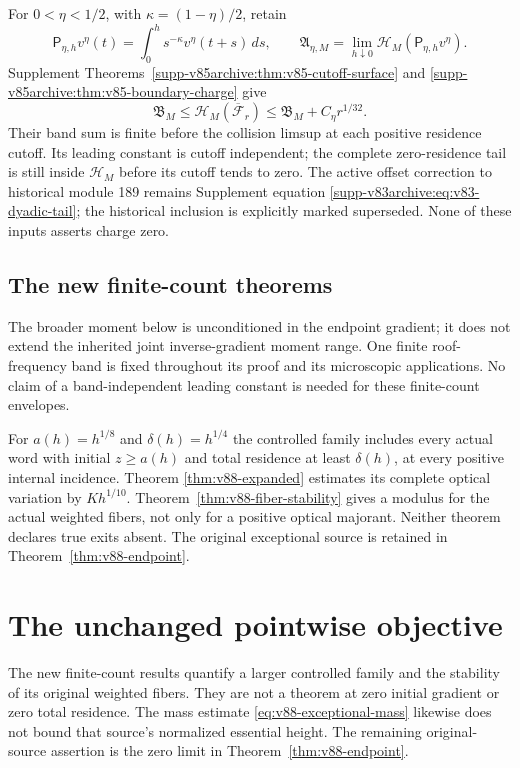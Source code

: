 \documentclass[11pt,reqno]{amsart}
\numberwithin{equation}{section}
\theoremstyle{definition}
\theoremstyle{remark}\newtheorem{remark}[theorem]{Remark}
\begin{document}
For $0<\eta<1/2$, with $\kappa=(1-\eta)/2$, retain
\[
 \mathsf P_{\eta,h}v^\eta(t)=\int_0^h s^{-\kappa}v^\eta(t+s)\,ds,
 \qquad\mathfrak A_{\eta,M}
       =\lim_{h\downarrow0}\mathcal H_M(\mathsf P_{\eta,h}v^\eta).
\]
Supplement Theorems~\ref{supp-v85archive:thm:v85-cutoff-surface}
and \ref{supp-v85archive:thm:v85-boundary-charge} give
\begin{equation}\label{eq:v86-surface-input}
 \mathfrak B_M\le\mathcal H_M(\overline{\mathcal F}_r)
                         \le\mathfrak B_M+C_\eta r^{1/32}.
\end{equation}
Their band sum is finite before the collision limsup at each positive
residence cutoff. Its leading constant is cutoff independent; the
complete zero-residence tail is still inside $\mathcal H_M$ before
its cutoff tends to zero. The active offset correction to historical
module 189 remains Supplement equation
\eqref{supp-v83archive:eq:v83-dyadic-tail}; the historical inclusion is
explicitly marked superseded. None of these inputs asserts charge zero.

\subsection{The new finite-count theorems}
The broader moment below is unconditioned in the endpoint gradient;
it does not extend the inherited joint inverse-gradient moment range.
One finite roof-frequency band is fixed throughout its proof and its
microscopic applications. No claim of a band-independent leading constant
is needed for these finite-count envelopes.

For $a(h)=h^{1/8}$ and $\delta(h)=h^{1/4}$ the controlled family
includes every actual word with initial $z\ge a(h)$ and total residence
at least $\delta(h)$, at every positive internal incidence. Theorem
\ref{thm:v88-expanded} estimates its complete optical variation by
$Kh^{1/10}$. Theorem~\ref{thm:v88-fiber-stability} gives a modulus for
the actual weighted fibers, not only for a positive optical majorant.
Neither theorem declares true exits absent. The original exceptional
source is retained in Theorem~\ref{thm:v88-endpoint}.





\section{The unchanged pointwise objective}
The new finite-count results quantify a larger controlled family and
the stability of its original weighted fibers. They are not a theorem
at zero initial gradient or zero total residence. The mass estimate
\eqref{eq:v88-exceptional-mass} likewise does not bound that source's
normalized essential height. The remaining original-source assertion
is the zero limit in Theorem~\ref{thm:v88-endpoint}.
\end{document}
